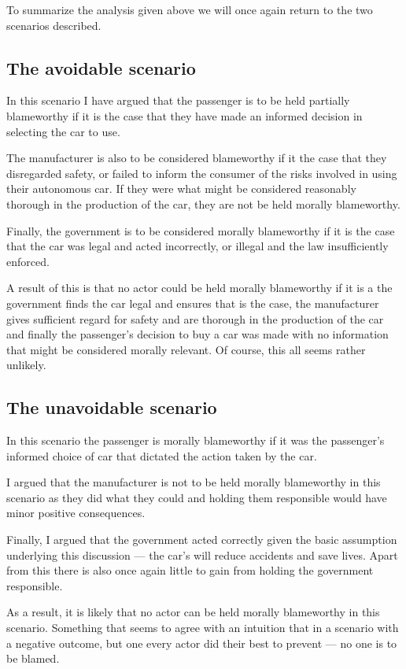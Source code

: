 To summarize the analysis given above we will once again return to the two
scenarios described.

\subsection{The avoidable scenario}
In this scenario I have argued that the passenger is to be held partially
blameworthy if it is the case that they have made an informed decision in
selecting the car to use.

The manufacturer is also to be considered blameworthy if it the case that they
disregarded safety, or failed to inform the consumer of the risks involved in
using their autonomous car. If they were what might be considered reasonably
thorough in the production of the car, they are not be held morally blameworthy.

Finally, the government is to be considered morally blameworthy if it is the
case that the car was legal and acted incorrectly, or illegal and the law
insufficiently enforced.

A result of this is that no actor could be held morally blameworthy if it is a
the government finds the car legal and ensures that is the case, the
manufacturer gives sufficient regard for safety and are thorough in the
production of the car and finally the passenger's decision to buy a car was made
with no information that might be considered morally relevant. Of course, this
all seems rather unlikely.

\subsection{The unavoidable scenario}
In this scenario the passenger is morally blameworthy if it was the passenger's
informed choice of car that dictated the action taken by the car.

I argued that the manufacturer is not to be held morally blameworthy in this
scenario as they did what they could and holding them responsible would have
minor positive consequences.

Finally, I argued that the government acted correctly given the basic assumption
underlying this discussion --- the car's will reduce accidents and save lives.
Apart from this there is also once again little to gain from holding the
government responsible.

As a result, it is likely that no actor can be held morally blameworthy in this
scenario. Something that seems to agree with an intuition that in a scenario
with a negative outcome, but one every actor did their best to prevent --- no
one is to be blamed.
